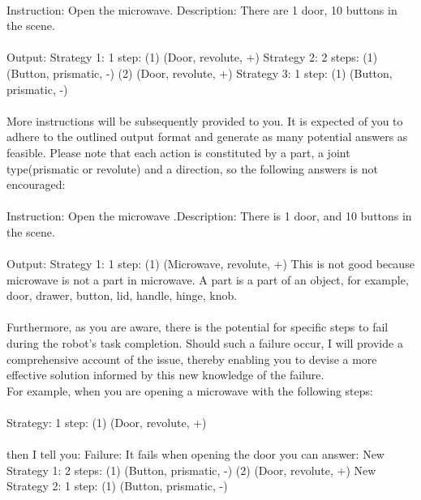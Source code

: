{{{{{\\
Instruction: Open the microwave. Description: There are 1 door, 10 buttons in the scene.\\
\\
Output:
Strategy 1: 1 step: (1) (Door, revolute, +)
Strategy 2: 2 steps: (1) (Button, prismatic, -) (2) (Door, revolute, +)
Strategy 3: 1 step: (1) (Button, prismatic, -)\\
\\
More instructions will be subsequently provided to you. It is expected of you to adhere to the outlined output format and generate as many potential answers as feasible. Please note that each action is constituted by a part, a joint type(prismatic or revolute) and a direction, so the following answers is not encouraged:\\
\\
Instruction: Open the microwave .Description: There is 1 door, and 10 buttons in the scene.\\
\\
Output:
Strategy 1: 1 step: (1) (Microwave, revolute, +)
This is not good because microwave is not a part in microwave. A part is a part of an object, for example, door, drawer, button, lid, handle, hinge, knob.\\
\\
Furthermore, as you are aware, there is the potential for specific steps to fail during the robot's task completion. Should such a failure occur, I will provide a comprehensive account of the issue, thereby enabling you to devise a more effective solution informed by this new knowledge of the failure. \\
For example, when you are opening a microwave with the following steps:\\
\\
Strategy: 1 step: (1) (Door, revolute, +)\\
\\
then I tell you:
Failure: It fails when opening the door
you can answer:
New Strategy 1: 2 steps: (1) (Button, prismatic, -) (2) (Door, revolute,  +)
New Strategy 2: 1 step: (1) (Button, prismatic, -)
}}}}}\\